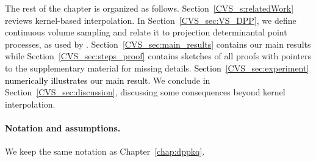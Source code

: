 \documentclass[twoside,11pt]{book}
\newcommand{\rev}[1]{\textcolor{black}{#1}}
\numberwithin{theorem}{chapter}
\numberwithin{definition}{chapter}
\numberwithin{proposition}{chapter}
\numberwithin{corollary}{chapter}
\numberwithin{example}{chapter}
\numberwithin{lemma}{chapter}
\numberwithin{assumption}{chapter}
\numberwithin{equation}{chapter}
\numberwithin{figure}{chapter}
\begin{document}

The rest of the chapter is organized as follows. Section~\ref{CVS_s:relatedWork} reviews kernel-based interpolation. In Section~\ref{CVS_sec:VS_DPP}, we define continuous volume sampling and relate it to projection determinantal point processes, as used by \cite{BeBaCh19}. Section~\ref{CVS_sec:main_results} contains our main results while Section~\ref{CVS_sec:steps_proof} contains sketches of all proofs with pointers to the supplementary material for missing details. \rev{Section~\ref{CVS_sec:experiment} numerically illustrates our main result.} We conclude in Section~\ref{CVS_sec:discussion}, discussing some consequences beyond kernel interpolation.

\paragraph{Notation and assumptions.}\label{CVS_paragraph:notation}
We keep the same notation as Chapter~\ref{chap:dppkq}. 
%
\end{document}
